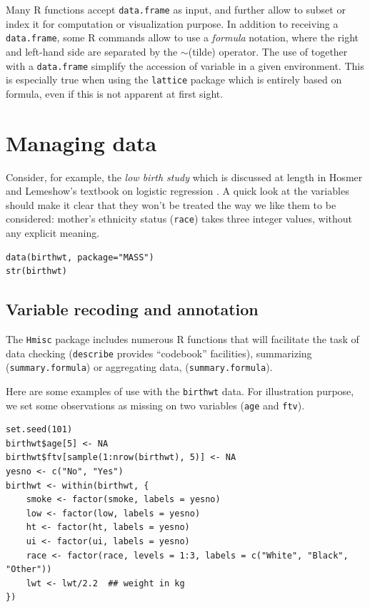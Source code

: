 \documentclass[a4paper,twoside]{book}
\renewcommand{\texttt}[1]{\lstinline{#1}}
\newcommand{\R}{\textsf{R}\xspace}
\newcommand{\mytilde}{\textcolor{myred3}{$\sim$}\xspace}
\begin{document}
Many \R functions accept \texttt{data.frame} as input, and further
allow to subset or index it for computation or visualization
purpose. In addition to receiving a \texttt{data.frame}, some \R
commands allow to use a \emph{formula} notation, where the right and
left-hand side are separated by the \mytilde (tilde) operator. The
use of  together with a \texttt{data.frame} simplify the
accession of variable in a given environment.
This is especially true when using the \texttt{lattice} package which
is entirely based on formula, even if this is not apparent at
first sight.

\section{Managing data}
Consider, for example, the \emph{low birth study} which is discussed
at length in Hosmer and Lemeshow's textbook on logistic regression
\autocite{hosmer89}. A quick look at the variables should make it
clear that they won't be treated the way we like them to be
considered: mother's ethnicity status (\texttt{race}) takes three
integer values, without any explicit meaning.

\begin{verbatim}
data(birthwt, package="MASS")
str(birthwt)
\end{verbatim}

\subsection{Variable recoding and annotation}
The \texttt{Hmisc} package includes numerous \R functions that will
facilitate the task of data checking (\texttt{describe} provides
``codebook'' facilities), summarizing (\texttt{summary.formula}) or
aggregating data, (\texttt{summary.formula}).

Here are some examples of use with the \texttt{birthwt} data. For
illustration purpose, we set some observations as missing on two variables
(\texttt{age} and \texttt{ftv}).

\begin{verbatim}
set.seed(101)
birthwt$age[5] <- NA
birthwt$ftv[sample(1:nrow(birthwt), 5)] <- NA
yesno <- c("No", "Yes")
birthwt <- within(birthwt, {
    smoke <- factor(smoke, labels = yesno)
    low <- factor(low, labels = yesno)
    ht <- factor(ht, labels = yesno)
    ui <- factor(ui, labels = yesno)
    race <- factor(race, levels = 1:3, labels = c("White", "Black", "Other"))
    lwt <- lwt/2.2  ## weight in kg
})
\end{verbatim}
\end{document}
